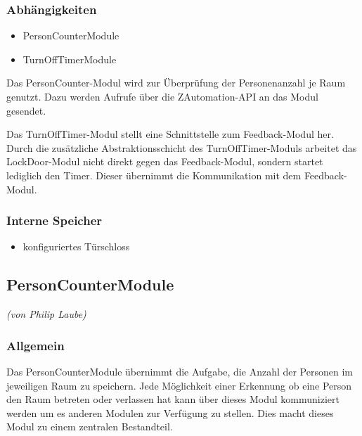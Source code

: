 
\subsubsection{Abhängigkeiten}
\begin{itemize}
	\item PersonCounterModule
	\item TurnOffTimerModule
\end{itemize}
Das PersonCounter-Modul wird zur Überprüfung der Personenanzahl je Raum genutzt. Dazu werden Aufrufe über die ZAutomation-API an das Modul gesendet.

Das TurnOffTimer-Modul stellt eine Schnittstelle zum Feedback-Modul her. Durch die zusätzliche Abstraktionsschicht des TurnOffTimer-Moduls arbeitet das LockDoor-Modul nicht direkt gegen das Feedback-Modul, sondern startet lediglich den Timer. Dieser übernimmt die Kommunikation mit dem Feedback-Modul.

\subsubsection{Interne Speicher}
\begin{itemize}
	\item konfiguriertes Türschloss
\end{itemize}


\subsection{PersonCounterModule}
\emph{(von Philip Laube)}
\subsubsection{Allgemein}
Das PersonCounterModule übernimmt die Aufgabe, die Anzahl der Personen im jeweiligen Raum zu speichern. Jede Möglichkeit einer Erkennung ob eine Person den Raum betreten oder verlassen hat kann über dieses Modul kommuniziert werden um es anderen Modulen zur Verfügung zu stellen. Dies macht dieses Modul zu einem zentralen Bestandteil.

